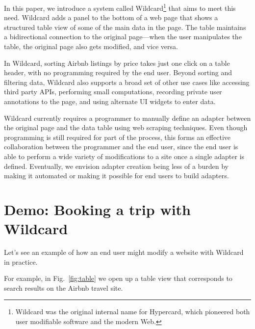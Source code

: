 \documentclass[english,submission]{programming}
\begin{document}
In this paper, we introduce a system called Wildcard\footnote{Wildcard
  was the original internal name for Hypercard, which pioneered both
  user modifiable software and the modern Web.} that aims to meet this
need. Wildcard adds a panel to the bottom of a web page that shows a
structured table view of some of the main data in the page. The table
maintains a bidirectional connection to the original page---when the
user manipulates the table, the original page also gets modified, and
vice versa.

In Wildcard, sorting Airbnb listings by price takes just one click on a
table header, with no programming required by the end user. Beyond
sorting and filtering data, Wildcard also supports a broad set of other
use cases like accessing third party APIs, performing small
computations, recording private user annotations to the page, and using
alternate UI widgets to enter data.

Wildcard currently requires a programmer to manually define an adapter
between the original page and the data table using web scraping
techniques. Even though programming is still required for part of the
process, this forms an effective collaboration between the programmer
and the end user, since the end user is able to perform a wide variety
of modifications to a site once a single adapter is defined. Eventually,
we envision adapter creation being less of a burden by making it
automated or making it possible for end users to build adapters.

\hypertarget{demo-booking-a-trip-with-wildcard}{%
\section{Demo: Booking a trip with
Wildcard}\label{demo-booking-a-trip-with-wildcard}}

Let's see an example of how an end user might modify a website with
Wildcard in practice.

For example, in Fig.~\ref{fig:table} we open up a table view that
corresponds to search results on the Airbnb travel site.
\end{document}
